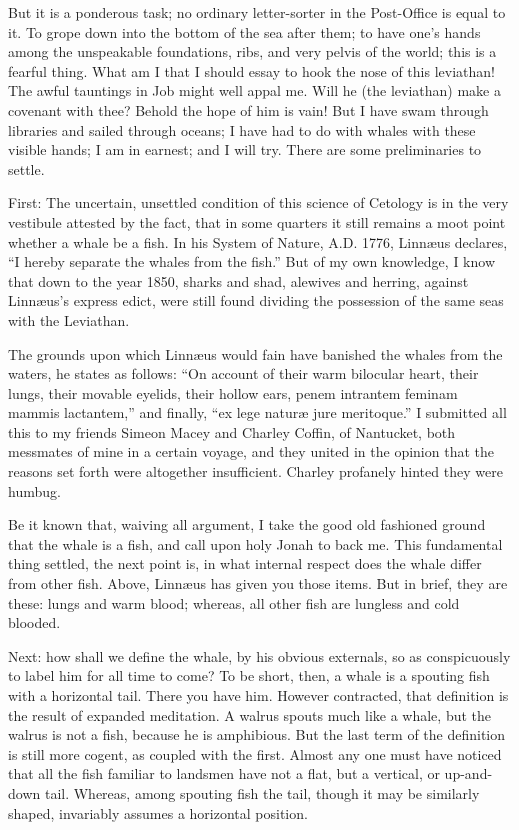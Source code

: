 But it is a ponderous task; no ordinary letter-sorter in the Post-Office is equal to it. To grope down into the bottom of the sea after them; to have one’s hands among the unspeakable foundations, ribs, and very pelvis of the world; this is a fearful thing. What am I that I should essay to hook the nose of this leviathan! The awful tauntings in Job might well appal me. Will he (the leviathan) make a covenant with thee? Behold the hope of him is vain! But I have swam through libraries and sailed through oceans; I have had to do with whales with these visible hands; I am in earnest; and I will try. There are some preliminaries to settle.

First: The uncertain, unsettled condition of this science of Cetology is in the very vestibule attested by the fact, that in some quarters it still remains a moot point whether a whale be a fish. In his System of Nature, A.D. 1776, Linnæus declares, “I hereby separate the whales from the fish.” But of my own knowledge, I know that down to the year 1850, sharks and shad, alewives and herring, against Linnæus’s express edict, were still found dividing the possession of the same seas with the Leviathan.

The grounds upon which Linnæus would fain have banished the whales from the waters, he states as follows: “On account of their warm bilocular heart, their lungs, their movable eyelids, their hollow ears, penem intrantem feminam mammis lactantem,” and finally, “ex lege naturæ jure meritoque.” I submitted all this to my friends Simeon Macey and Charley Coffin, of Nantucket, both messmates of mine in a certain voyage, and they united in the opinion that the reasons set forth were altogether insufficient. Charley profanely hinted they were humbug.

Be it known that, waiving all argument, I take the good old fashioned ground that the whale is a fish, and call upon holy Jonah to back me. This fundamental thing settled, the next point is, in what internal respect does the whale differ from other fish. Above, Linnæus has given you those items. But in brief, they are these: lungs and warm blood; whereas, all other fish are lungless and cold blooded.

Next: how shall we define the whale, by his obvious externals, so as conspicuously to label him for all time to come? To be short, then, a whale is a spouting fish with a horizontal tail. There you have him. However contracted, that definition is the result of expanded meditation. A walrus spouts much like a whale, but the walrus is not a fish, because he is amphibious. But the last term of the definition is still more cogent, as coupled with the first. Almost any one must have noticed that all the fish familiar to landsmen have not a flat, but a vertical, or up-and-down tail. Whereas, among spouting fish the tail, though it may be similarly shaped, invariably assumes a horizontal position.

